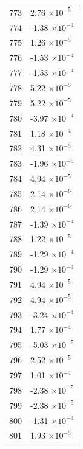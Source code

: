 \documentclass[a4paper,11pt]{article}
\begin{document}
\begin{center}
\begin{longtable}{|R{1.5cm}|R{2.5cm}|}
  773 &         2.76 $\times 10^{          -5}$ \\
  774 &        -1.38 $\times 10^{          -4}$ \\
  775 &         1.26 $\times 10^{          -5}$ \\
  776 &        -1.53 $\times 10^{          -4}$ \\
  777 &        -1.53 $\times 10^{          -4}$ \\
  778 &         5.22 $\times 10^{          -5}$ \\
  779 &         5.22 $\times 10^{          -5}$ \\
  780 &        -3.97 $\times 10^{          -4}$ \\
  781 &         1.18 $\times 10^{          -4}$ \\
  782 &         4.31 $\times 10^{          -5}$ \\
  783 &        -1.96 $\times 10^{          -5}$ \\
  784 &         4.94 $\times 10^{          -5}$ \\
  785 &         2.14 $\times 10^{          -6}$ \\
  786 &         2.14 $\times 10^{          -6}$ \\
  787 &        -1.39 $\times 10^{          -4}$ \\
  788 &         1.22 $\times 10^{          -5}$ \\
  789 &        -1.29 $\times 10^{          -4}$ \\
  790 &        -1.29 $\times 10^{          -4}$ \\
  791 &         4.94 $\times 10^{          -5}$ \\
  792 &         4.94 $\times 10^{          -5}$ \\
  793 &        -3.24 $\times 10^{          -4}$ \\
  794 &         1.77 $\times 10^{          -4}$ \\
  795 &        -5.03 $\times 10^{          -5}$ \\
  796 &         2.52 $\times 10^{          -5}$ \\
  797 &         1.01 $\times 10^{          -4}$ \\
  798 &        -2.38 $\times 10^{          -5}$ \\
  799 &        -2.38 $\times 10^{          -5}$ \\
  800 &        -1.31 $\times 10^{          -4}$ \\
  801 &         1.93 $\times 10^{          -5}$ \\

\end{longtable}
\end{center}
\end{document}
